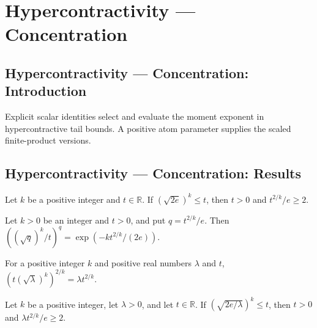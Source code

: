 \section{Hypercontractivity --- Concentration}
\subsection*{Hypercontractivity --- Concentration: Introduction}
Explicit scalar identities select and evaluate the moment exponent in hypercontractive tail bounds. A positive atom parameter supplies the scaled finite-product versions.

\subsection*{Hypercontractivity --- Concentration: Results}

\begin{lemma}
\leanok
{}
Let $k$ be a positive integer and $t\in\mathbb R$. If $(\sqrt{2e})^k\le t$, then $t>0$
and $t^{2/k}/e\ge2$.
\end{lemma}

\begin{lemma}
\leanok
{}
Let $k>0$ be an integer and $t>0$, and put $q=t^{2/k}/e$. Then $((\sqrt q)^k/t)^q=\exp(-kt^{2/k}/(2e))$.
\end{lemma}

\begin{lemma}
\leanok
{}
For a positive integer $k$ and positive real numbers $\lambda$ and $t$,
$(t(\sqrt\lambda)^k)^{2/k}=\lambda t^{2/k}$.
\end{lemma}

\begin{lemma}
\leanok
{}
Let $k$ be a positive integer, let $\lambda>0$, and let $t\in\mathbb R$. If
$(\sqrt{2e/\lambda})^k\le t$, then $t>0$ and $\lambda t^{2/k}/e\ge2$.
\end{lemma}

